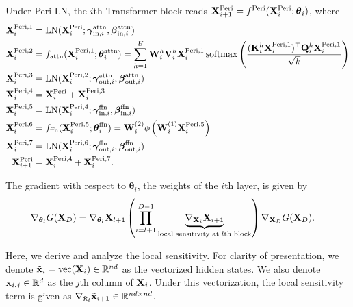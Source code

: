 \documentclass[journal]{IEEEtran}
\newcommand{\bfK}{{\bf K}}
\newcommand{\bfQ}{{\bf Q}}
\newcommand{\bfV}{{\bf V}}
\newcommand{\bfW}{{\bf W}}
\newcommand{\bfX}{{\bf X}}
\newcommand{\bfx}{{\bf x}}
\newcommand{\bftheta}{{\boldsymbol \theta}}
\newcommand{\bfgamma}{{\boldsymbol \gamma}}
\newcommand{\bfbeta}{{\boldsymbol \beta}}
\theoremstyle{plain}
\theoremstyle{definition}
\theoremstyle{remark}
\begin{document}
Under Peri-LN, the $i$th Transformer block reads $\bfX^{{\rm Peri}}_{i+1}=f^{\rm Peri}(\bfX^{{\rm Peri}}_i; \bftheta_i)$, where
\begin{align}
     \bfX^{{\rm Peri}, 1}_{i} &= {\rm LN}(\bfX^{{\rm Peri}}_i; \bfgamma_{{\rm in}, i}^{\rm attn}, \bfbeta_{{\rm in}, i}^{\rm attn}) \\
     \bfX^{{\rm Peri}, 2}_{i} &= f_{\rm attn}(\bfX_i^{{\rm Peri}, 1}; \bftheta^{\rm attn}_i) = \sum_{h=1}^H  \bfW_i^h \bfV_i^h \bfX_i^{{\rm Peri}, 1} \, {\rm softmax} \left( \frac{(\bfK_i^h \bfX_i^{{\rm Peri}, 1})^\top \bfQ_i^h \bfX_{i}^{{\rm Peri}, 1}}{\sqrt{k}} \right) \label{eq:Peri_2_appendix} \\
     \bfX^{{\rm Peri}, 3}_{i} &= {\rm LN}(\bfX^{{\rm Peri}, 2}_i; \bfgamma_{{\rm out}, i}^{\rm attn}, \bfbeta_{{\rm out}, i}^{\rm attn})\\
     \bfX^{{\rm Peri}, 4}_{i} &= \bfX^{\rm Peri}_i + \bfX^{{\rm Peri}, 3}_{i} \\
     \bfX^{{\rm Peri}, 5}_{i} &= {\rm LN}(\bfX^{{\rm Peri}, 4}_{i}; \bfgamma_{{\rm in}, i}^{\rm ffn}, \bfbeta_{{\rm in}, i}^{\rm ffn}) \\
     \bfX^{{\rm Peri}, 6}_{i} &=  f_{\rm ffn}(\bfX^{{\rm Peri}, 5}_{i};\bftheta^{\rm ffn}_{i}) = \bfW_{i}^{(2)} \phi \left( \bfW_{i}^{(1)}\bfX^{{\rm Peri}, 5}_{i}  \right)  \label{eq:Peri_6_appendix}\\
     \bfX^{{\rm Peri}, 7}_{i} &= {\rm LN}(\bfX^{{\rm Peri}, 6}_i; \bfgamma_{{\rm out}, i}^{\rm ffn}, \bfbeta_{{\rm out}, i}^{\rm ffn})\\
     \bfX^{{\rm Peri}}_{i+1} &= \bfX^{{\rm Peri}, 4}_{i} + \bfX^{{\rm Peri}, 7}_{i}.
\end{align}

The gradient with respect to $\bftheta_i$, the weights of the $i$th layer, is given by
\begin{align}\label{eq:gradient_product_appendix}
\begin{split}
    \nabla_{\bftheta_l} G(\bfX_D) &= \nabla_{\bftheta_l} \bfX_{l+1} \left( \prod_{i=l+1}^{D-1} \underbrace{\nabla_{\bfX_{i}} \bfX_{i+1}}_{\text{local sensitivity at $l$th block}} \right) \nabla_{\bfX_D} G(\bfX_D). 
\end{split}
\end{align}

Here, we derive and analyze the local sensitivity. For clarity of presentation, we denote $\tilde{\bfx}_i = {\rm vec}(\bfX_i) \in \mathbb{R}^{nd}$ as the vectorized hidden states. We also denote $\bfx_{i,j} \in \mathbb{R}^{d}$ as the $j$th column of $\bfX_i$. Under this vectorization, the local sensitivity term is given as $\nabla_{\tilde{\bfx}_{i}} \tilde{\bfx}_{i+1} \in \mathbb{R}^{nd \times nd}$.
\end{document}
